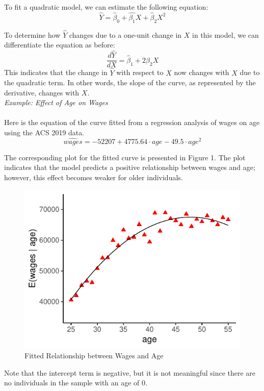 \documentclass{./../../Latex/handout}
\begin{document}
 To fit a quadratic model, we can estimate the following equation: 
 $$ \hat{Y} =  \hat{\beta}_0 + \hat{\beta_1} X + \hat{\beta}_2 X^2  $$

To determine how $\hat{Y}$ changes due to a one-unit change in $X$ in this model, we can differentiate the equation as before:
  $$ \frac{d\hat{Y}}{d X} =  \hat{\beta}_1 + 2 \hat{\beta}_2 X $$
This indicates that the change in $\hat{Y}$ with respect to $X$ now changes with $X$ due to the quadratic term. In other words, the slope of the curve, as represented by the derivative, changes with $X$. \\
 
\textit{Example: Effect of Age on Wages} \\~\\
Here is the equation of the curve fitted from a regression analysis of wages on age using the ACS 2019 data.
$$ \hat{wages} = -52207 + 4775.64 \cdot age -49.5 \cdot age^2   $$

The corresponding plot for the fitted curve is presented in Figure 1. The plot indicates that the model predicts a positive relationship between wages and age; however, this effect becomes weaker for older individuals.

\begin{figure}[t]\caption{Fitted Relationship between Wages and Age}
\centering
	\includegraphics{./../../output/scatter_age_wage_qfit.pdf}	
\end{figure}

Note that the intercept term is negative, but it is not meaningful since there are no individuals in the sample with an age of 0. 
\end{document}
